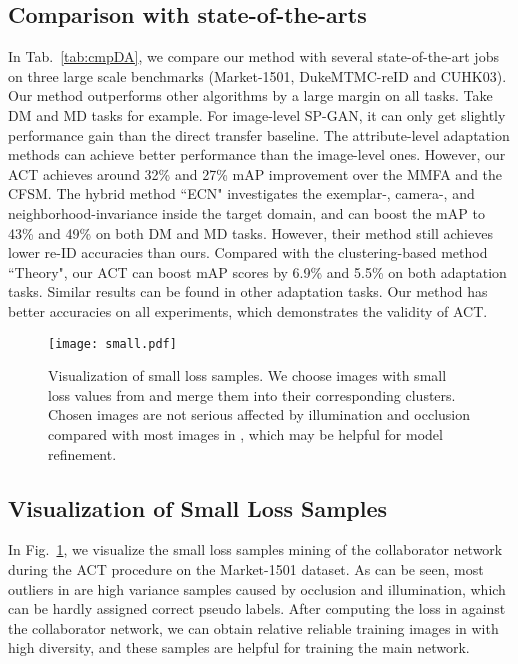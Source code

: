 \documentclass[letterpaper]{article} \usepackage{aaai20}  \usepackage{times}  \usepackage{helvet} \usepackage{courier}  \usepackage[hyphens]{url}  \usepackage{graphicx} \urlstyle{rm} \def\UrlFont{\rm}  \usepackage{graphicx}  \frenchspacing  \setlength{\pdfpagewidth}{8.5in}  \setlength{\pdfpageheight}{11in}  \usepackage{color}
\begin{document}
\subsection{Comparison with state-of-the-arts} 

In Tab.~\ref{tab:cmpDA}, we compare our method with several state-of-the-art jobs on three large scale benchmarks (Market-1501, DukeMTMC-reID and CUHK03). Our method outperforms other algorithms by a large margin on all tasks. Take DM and MD tasks for example. For image-level SP-GAN, it can only get slightly performance gain than the direct transfer baseline. The attribute-level adaptation methods can achieve better performance than the image-level ones. However, our ACT achieves around 32\% and 27\% mAP improvement over the MMFA and the CFSM. The hybrid method ``ECN" investigates the exemplar-, camera-, and neighborhood-invariance inside the target domain, and can boost the mAP to 43\% and 49\% on both DM and MD tasks. However, their method still achieves lower re-ID accuracies than ours. Compared with the clustering-based method ``Theory", our ACT can boost mAP scores by 6.9\% and 5.5\% on both adaptation tasks. Similar results can be found in other adaptation tasks. Our method has better accuracies on all experiments, which demonstrates the validity of ACT.

\begin{figure}[!t]
  \centering
  \texttt{[image: small.pdf]}
  \caption{Visualization of small loss samples. We choose images with small loss values from  and merge them into their corresponding clusters. Chosen images are not serious affected by illumination and occlusion compared with most images in , which may be helpful for model refinement.}
  \label{fig:small}
\end{figure}

\subsection{Visualization of Small Loss Samples} 
In Fig.~\ref{fig:small}, we visualize the small loss samples mining of the collaborator network during the ACT procedure on the Market-1501 dataset. As can be seen, most outliers in  are high variance samples caused by occlusion and illumination, which can be hardly assigned correct pseudo labels. After computing the loss in  against the collaborator network, we can obtain relative reliable training images in  with high diversity, and these samples are helpful for training the main network. 
\end{document}
